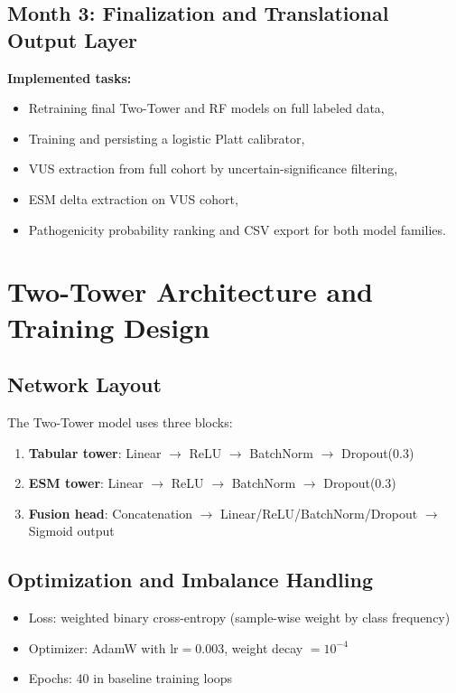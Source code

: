 \documentclass[11pt,a4paper]{article}
\begin{document}
\subsection{Month 3: Finalization and Translational Output Layer}
\textbf{Implemented tasks:}
\begin{itemize}[leftmargin=1.2cm]
    \item Retraining final Two-Tower and RF models on full labeled data,
    \item Training and persisting a logistic Platt calibrator,
    \item VUS extraction from full cohort by uncertain-significance filtering,
    \item ESM delta extraction on VUS cohort,
    \item Pathogenicity probability ranking and CSV export for both model families.
\end{itemize}

\section{Two-Tower Architecture and Training Design}
\subsection{Network Layout}
The Two-Tower model uses three blocks:
\begin{enumerate}[leftmargin=1.2cm]
    \item \textbf{Tabular tower}: Linear $\rightarrow$ ReLU $\rightarrow$ BatchNorm $\rightarrow$ Dropout(0.3)
    \item \textbf{ESM tower}: Linear $\rightarrow$ ReLU $\rightarrow$ BatchNorm $\rightarrow$ Dropout(0.3)
    \item \textbf{Fusion head}: Concatenation $\rightarrow$ Linear/ReLU/BatchNorm/Dropout $\rightarrow$ Sigmoid output
\end{enumerate}

\subsection{Optimization and Imbalance Handling}
\begin{itemize}[leftmargin=1.2cm]
    \item Loss: weighted binary cross-entropy (sample-wise weight by class frequency)
    \item Optimizer: AdamW with $\text{lr}=0.003$, weight decay $=10^{-4}$
    \item Epochs: 40 in baseline training loops
\end{itemize}
\end{document}
